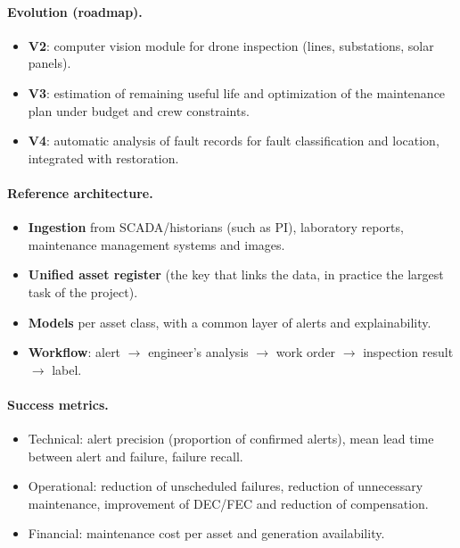 \documentclass[10pt,a4paper,oneside]{article}
\begin{document}
\paragraph{Evolution (roadmap).}
\begin{itemize}
  \item \textbf{V2}: computer vision module for drone inspection (lines,
    substations, solar panels).
  \item \textbf{V3}: estimation of remaining useful life and optimization of
    the maintenance plan under budget and crew constraints.
  \item \textbf{V4}: automatic analysis of fault records for fault
    classification and location, integrated with restoration.
\end{itemize}

\paragraph{Reference architecture.}
\begin{itemize}
  \item \textbf{Ingestion} from SCADA/historians (such as PI), laboratory
    reports, maintenance management systems and images.
  \item \textbf{Unified asset register} (the key that links the data, in
    practice the largest task of the project).
  \item \textbf{Models} per asset class, with a common layer of alerts and
    explainability.
  \item \textbf{Workflow}: alert $\rightarrow$ engineer's analysis
    $\rightarrow$ work order $\rightarrow$ inspection result
    $\rightarrow$ label.
\end{itemize}

\paragraph{Success metrics.}
\begin{itemize}
  \item Technical: alert precision (proportion of confirmed alerts), mean
    lead time between alert and failure, failure recall.
  \item Operational: reduction of unscheduled failures, reduction of
    unnecessary maintenance, improvement of DEC/FEC and reduction of
    compensation.
  \item Financial: maintenance cost per asset and generation availability.
\end{itemize}
\end{document}
